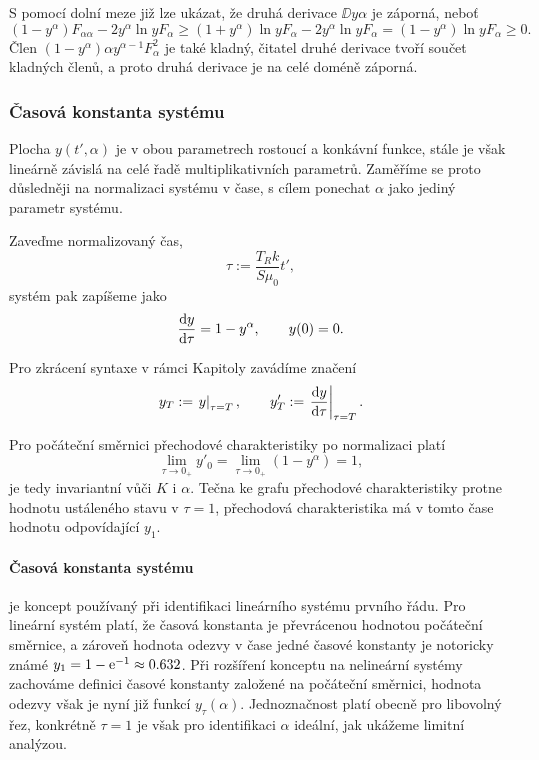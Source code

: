 S pomocí dolní meze již lze ukázat, že druhá derivace $\DD{y}{\alpha}$ je záporná, neboť
\begin{equation}
    (1-y^\alpha)F_{\alpha\alpha}-2y^\alpha\ln{y}F_\alpha\geq(1+y^\alpha)\ln{y}F_\alpha-2y^\alpha\ln{y}F_\alpha=(1-y^\alpha)\ln{y}F_\alpha\geq0.
\end{equation}
Člen $(1-y^\alpha)\alpha y^{\alpha-1}F_\alpha^2$ je také kladný, čitatel druhé derivace tvoří součet kladných členů, a proto druhá derivace je na celé doméně záporná.

\subsubsection{Časová konstanta systému}\label{sss:casova_konstanta_systemu}
Plocha $y(t',\alpha)$ je v obou parametrech rostoucí a konkávní funkce, stále je však lineárně závislá na celé řadě multiplikativních parametrů. Zaměříme se proto důsledněji na normalizaci systému v čase, s cílem ponechat $\alpha$ jako jediný parametr systému.

Zaveďme normalizovaný čas,
\begin{equation}
    \tau:=\frac{T_R k}{S \mu_0 }t',
\end{equation}
systém  pak zapíšeme jako
\begin{equation}
    \frac{\mathrm{d} y}{\mathrm{d} \tau}=1-y^\alpha, \qquad y(0)=0.
\end{equation}

Pro zkrácení syntaxe v rámci Kapitoly zavádíme značení
\begin{equation}
    y_T:=\left.y\right|_{\tau=T},\qquad y'_T:=\left.\frac{\mathrm{d} y}{\mathrm{d} \tau}\right|_{\tau=T}.
\end{equation}

Pro počáteční směrnici přechodové charakteristiky po normalizaci platí
\begin{equation}
    \lim_{\tau\to0_+}y'_0=\lim_{\tau\to0_+}(1-y^\alpha)=1,
\end{equation}
je tedy invariantní vůči $K$ i $\alpha$. Tečna ke grafu přechodové charakteristiky protne hodnotu ustáleného stavu v $\tau=1$, přechodová charakteristika má v tomto čase hodnotu odpovídající $y_1$.

\paragraph{Časová konstanta systému} je koncept používaný při identifikaci lineárního systému prvního řádu. Pro lineární systém platí, že časová konstanta je převrácenou hodnotou počáteční směrnice, a zároveň hodnota odezvy v čase jedné časové konstanty je notoricky známé $y_1=1-\mathrm{e}^{-1}\approx\num{0.632}$. Při rozšíření konceptu na nelineární systémy zachováme definici časové konstanty založené na počáteční směrnici, hodnota odezvy však je nyní již funkcí $y_\tau(\alpha)$. Jednoznačnost platí obecně pro libovolný řez, konkrétně $\tau=1$ je však pro identifikaci $\alpha$ ideální, jak ukážeme limitní analýzou. 


